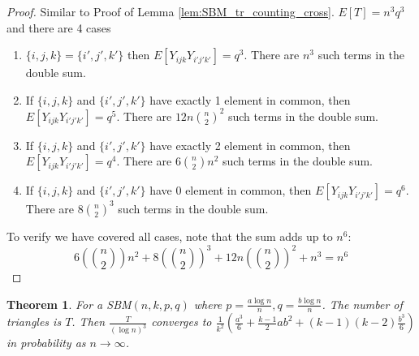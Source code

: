 \documentclass{article}
\newtheorem{theorem}{Theorem}
\begin{document}
\begin{proof}
	Similar to Proof of Lemma \ref{lem:SBM_tr_counting_cross}.
	$E[T] = n^3 q^3$ and there are 4 cases
	\begin{enumerate}
	\item $\{i,j,k\} = \{i',j',k'\}$ then $E[Y_{ijk}Y_{i'j'k'}] = q^3$.
	There are $n^3$ such terms in the double sum.
	\item If $\{i,j,k\}$ and $\{i',j',k'\}$ have exactly 1 element in common, then $E[Y_{ijk}Y_{i'j'k'}] = q^5$.
	There are $12n\binom{n}{2}^2$ such terms in the double sum.
	\item If $\{i,j,k\}$ and $\{i',j',k'\}$ have exactly 2 element in common, then $E[Y_{ijk}Y_{i'j'k'}] = q^4$.
	There are $6\binom{n}{2}n^2$ such terms in the double sum.
	\item If $\{i,j,k\}$ and $\{i',j',k'\}$ have 0 element in common, then $E[Y_{ijk}Y_{i'j'k'}] = q^6$.
	There are $8\binom{n}{2}^3$ such terms in the double sum.		
\end{enumerate}	
To verify we have covered all cases, note that the sum adds up to $n^6$:
$$
6(\binom{n}{2})n^2  + 8(\binom{n}{2})^3 + 12n(\binom{n}{2})^2 +  n^3 = n^6
$$
\end{proof}
\begin{theorem}
	For a SBM$(n, k, p, q)$ where $p=\frac{a\log n}{n}, q = \frac{b\log n}{n}$. The number of triangles is $T$.
	Then $\frac{T}{(\log n)^3}$ converges to $\frac{1}{k^2}(\frac{a^3}{6} + \frac{k-1}{2}ab^2 + (k-1)(k-2)\frac{b^3}{6} )$ in probability as $n \to \infty$.
\end{theorem}
\end{document}
